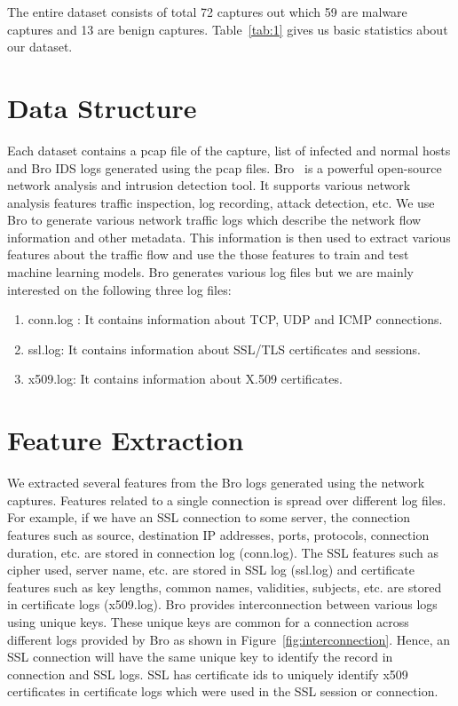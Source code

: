 The entire dataset consists of total 72 captures out which 59 are malware captures and 13 are benign captures. Table~\ref{tab:1} gives us basic statistics about our dataset.

\section{Data Structure}

Each dataset contains a pcap file of the capture, list of infected and normal hosts and Bro IDS logs generated using the pcap files. Bro~\cite{Bro} is a powerful open-source network analysis and intrusion detection tool. It supports various network analysis features traffic inspection, log recording, attack detection, etc. We use Bro to generate various network traffic logs which describe the network flow information and other metadata. This information is then used to extract various features about the traffic flow and use the those features to train and test machine learning models. Bro generates various log files but we are mainly interested on the following three log files:

\begin{enumerate}
	\item conn.log : It contains information about TCP, UDP and ICMP connections.
	\item ssl.log: It contains information about SSL/TLS certificates and sessions.
	\item x509.log: It contains information about X.509 certificates.
\end{enumerate}

\section{Feature Extraction}

We extracted several features from the Bro logs generated using the network captures. Features related to a single connection is spread over different log files. For example, if we have an SSL connection to some server, the connection features such as source, destination IP addresses, ports, protocols, connection duration, etc. are stored in connection log (conn.log). The SSL features such as cipher used,  server name, etc. are stored in SSL log (ssl.log) and certificate features such as key lengths, common names, validities, subjects, etc. are stored in certificate logs (x509.log). Bro provides interconnection between various logs using unique keys. These unique keys are common for a connection across different logs provided by Bro as shown in Figure~\ref{fig:interconnection}. Hence, an SSL connection will have the same unique key to identify the record in connection and SSL logs. SSL has certificate ids to uniquely identify x509 certificates in certificate logs which were used in the SSL session or connection.

